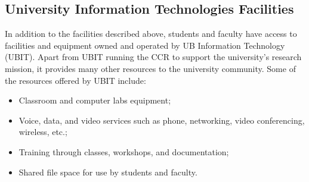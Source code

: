 \subsection*{University Information Technologies Facilities}

In addition to the facilities described above, students and faculty have
access to facilities and equipment owned and operated by UB Information
Technology (UBIT). Apart from UBIT running the CCR to support the
university's research mission, it provides many other resources to the
university community. Some of the resources offered by UBIT include:


\begin{itemize}
  \item Classroom and computer labs equipment;
  \item Voice, data, and video services such as phone, networking, video
    conferencing, wireless, etc.; 
  \item Training through classes, workshops, and documentation;
  \item Shared file space for use by students and faculty.
\end{itemize}


